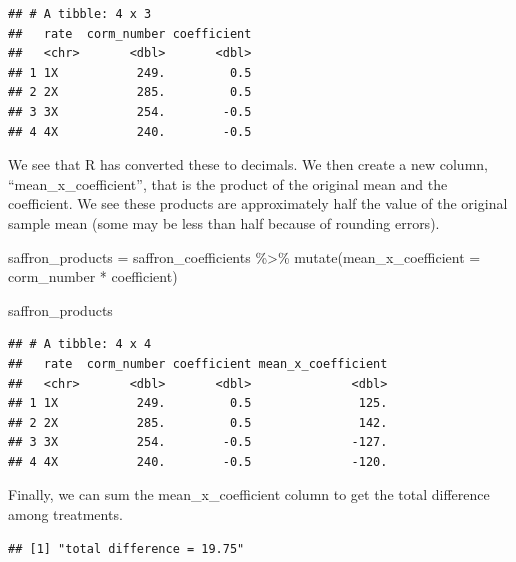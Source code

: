 \documentclass[
]{book}
\newenvironment{Shaded}{\begin{snugshade}}{\end{snugshade}}
\newcommand{\AttributeTok}[1]{\textcolor[rgb]{0.77,0.63,0.00}{#1}}
\newcommand{\FunctionTok}[1]{\textcolor[rgb]{0.00,0.00,0.00}{#1}}
\newcommand{\NormalTok}[1]{#1}
\newcommand{\OtherTok}[1]{\textcolor[rgb]{0.56,0.35,0.01}{#1}}
\newcommand{\SpecialCharTok}[1]{\textcolor[rgb]{0.00,0.00,0.00}{#1}}
\newcommand{\StringTok}[1]{\textcolor[rgb]{0.31,0.60,0.02}{#1}}
\begin{document}
\begin{verbatim}
## # A tibble: 4 x 3
##   rate  corm_number coefficient
##   <chr>       <dbl>       <dbl>
## 1 1X           249.         0.5
## 2 2X           285.         0.5
## 3 3X           254.        -0.5
## 4 4X           240.        -0.5
\end{verbatim}

We see that R has converted these to decimals. We then create a new column, ``mean\_x\_coefficient'', that is the product of the original mean and the coefficient. We see these products are approximately half the value of the original sample mean (some may be less than half because of rounding errors).

\begin{Shaded}
\begin{Highlighting}[]
\NormalTok{saffron\_products }\OtherTok{=}\NormalTok{ saffron\_coefficients }\SpecialCharTok{\%\textgreater{}\%}
  \FunctionTok{mutate}\NormalTok{(}\AttributeTok{mean\_x\_coefficient =}\NormalTok{  corm\_number }\SpecialCharTok{*}\NormalTok{ coefficient)}

\NormalTok{saffron\_products}
\end{Highlighting}
\end{Shaded}

\begin{verbatim}
## # A tibble: 4 x 4
##   rate  corm_number coefficient mean_x_coefficient
##   <chr>       <dbl>       <dbl>              <dbl>
## 1 1X           249.         0.5               125.
## 2 2X           285.         0.5               142.
## 3 3X           254.        -0.5              -127.
## 4 4X           240.        -0.5              -120.
\end{verbatim}

Finally, we can sum the mean\_x\_coefficient column to get the total difference among treatments.

\begin{Shaded}
\end{Shaded}

\begin{verbatim}
## [1] "total difference = 19.75"
\end{verbatim}
\end{document}
